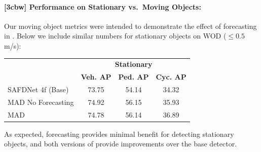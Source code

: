 \documentclass[10pt,twocolumn,letterpaper]{article}
\newcommand{\reviewerTwo}{{\textcolor{Mulberry}{\textbf{3cbw}}}}
\begin{document}
\paragraph{[\reviewerTwo{}] Performance on Stationary vs.\ Moving Objects:}
Our moving object metrics were intended to demonstrate the effect of forecasting in \ourmodel{}.
Below we include similar numbers for stationary objects on WOD ($\le 0.5$ m/s):
\vspace{-2mm}
\begin{center}
\footnotesize
\begin{tabular}{lccc}
\toprule
 & \multicolumn{3}{c}{\textbf{Stationary}} \\
 & \textbf{Veh. AP} & \textbf{Ped. AP} & \textbf{Cyc. AP} \\
\midrule
SAFDNet 4f (Base)  & 73.75 & 54.14 & 34.32 \\
MAD No Forecasting & 74.92 & 56.15 & 35.93 \\
MAD                & 74.78 & 56.14 & 36.89 \\
\bottomrule
\end{tabular}
\end{center}
\vspace{-1mm}
As expected, forecasting provides minimal benefit for detecting stationary objects, and both versions of \ourmodel{} provide improvements over the base detector.
\end{document}
